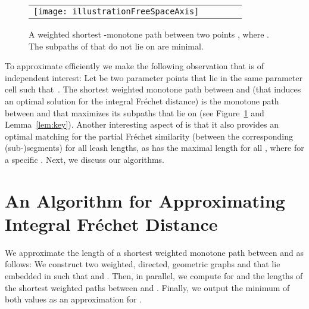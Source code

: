 \documentclass[a4paper,11pt]{article}
\begin{document}
\begin{figure}[ht]
  \begin{center}
    \begin{tabular}{ccccc}
      \texttt{[image: illustrationFreeSpaceAxis]} & &\\
\end{tabular}
  \end{center}
  \vspace*{-12pt}
  \caption{A weighted shortest -monotone path  between two points , where . The subpaths of   that do not lie on  are minimal.}
  \label{fig:shortestVSaxis}
\end{figure}	
	
	To approximate  efficiently we make the following observation that is of independent interest: Let  be two parameter points that lie in the same parameter cell  such that~. The shortest weighted monotone path  between  and  (that induces an optimal solution for the integral Fr\'{e}chet distance) is the monotone path between  and  that maximizes its subpaths that lie on   (see Figure~\ref{fig:shortestVSaxis} and Lemma~\ref{lem:key}). Another interesting aspect of  is that it also provides an optimal matching for the partial Fr\'{e}chet similarity (between the corresponding (sub-)segments) for all leash lengths,  as  has the maximal length for all , where  for a specific . Next, we discuss our algorithms.
	

\section{An Algorithm for Approximating Integral Fr\'{e}chet Distance}\label{sec:pre}
We approximate the length of a shortest weighted monotone path between  and  as follows: We construct two weighted, directed, geometric graphs  and  that lie embedded in  such that  and . Then, in parallel, we compute for  and  the lengths of the shortest weighted paths between  and . Finally, we output the minimum of both values as an approximation for .
	
\end{document}

